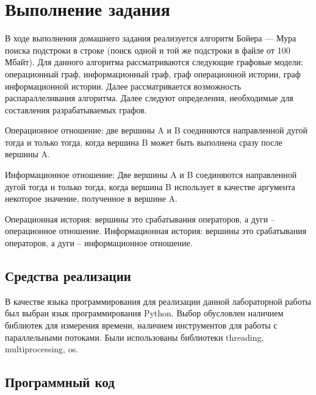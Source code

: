 \chapter{Выполнение задания}

В ходе выполнения домашнего задания реализуется алгоритм Бойера --- Мура поиска подстроки в
строке (поиск одной и той же подстроки в файле от 100 Мбайт).
Для данного алгоритма рассматриваются следующие графовые модели: операционный граф, информационный граф, граф операционной истории, граф информационной истории. Далее рассматривается возможность распараллеливания алгоритма.
Далее следуют определения, необходимые для составления разрабатываемых графов.


Операционное отношение: две вершины A и B соединяются направленной дугой тогда и только тогда, когда вершина B может быть выполнена сразу после вершины A.


Информационное отношение: Две вершины A и B соединяются направленной дугой тогда и только тогда, когда вершина B использует в
качестве аргумента некоторое значение, полученное в вершине A.


Операционная история: вершины это срабатывания операторов, а дуги -- операционное отношение.
Информационная история: вершины это срабатывания операторов, а дуги -- информационное отношение.
\section{Средства реализации}

В качестве языка программирования для реализации данной лабораторной работы был выбран язык программирования Python. Выбор обусловлен наличием библиотек для измерения времени, наличием инструментов для работы с параллельными потоками. Были использованы библиотеки threading, multiprocessing, os.

\section{Программный код}

